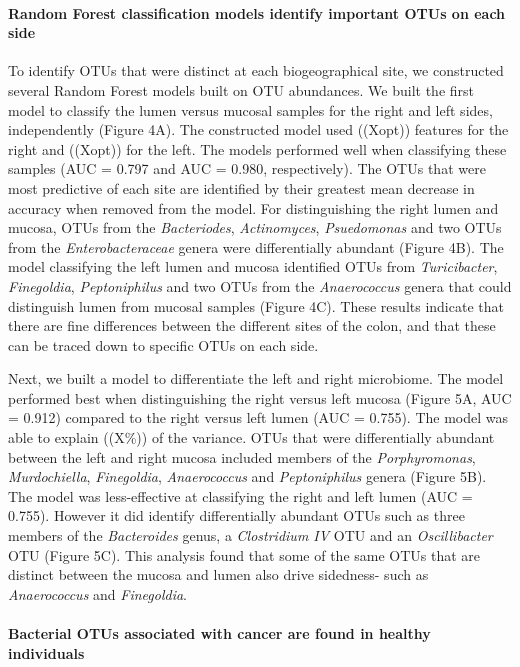 \documentclass[11pt,]{article}
\let\oldparagraph\paragraph
\renewcommand{\paragraph}[1]{\oldparagraph{#1}\mbox{}}
\begin{document}
\paragraph{Random Forest classification models identify important OTUs
on each
side}\label{random-forest-classification-models-identify-important-otus-on-each-side}

To identify OTUs that were distinct at each biogeographical site, we
constructed several Random Forest models built on OTU abundances. We
built the first model to classify the lumen versus mucosal samples for
the right and left sides, independently (Figure 4A). The constructed
model used ((Xopt)) features for the right and ((Xopt)) for the left.
The models performed well when classifying these samples (AUC = 0.797
and AUC = 0.980, respectively). The OTUs that were most predictive of
each site are identified by their greatest mean decrease in accuracy
when removed from the model. For distinguishing the right lumen and
mucosa, OTUs from the \emph{Bacteriodes}, \emph{Actinomyces},
\emph{Psuedomonas} and two OTUs from the \emph{Enterobacteraceae} genera
were differentially abundant (Figure 4B). The model classifying the left
lumen and mucosa identified OTUs from \emph{Turicibacter},
\emph{Finegoldia}, \emph{Peptoniphilus} and two OTUs from the
\emph{Anaerococcus} genera that could distinguish lumen from mucosal
samples (Figure 4C). These results indicate that there are fine
differences between the different sites of the colon, and that these can
be traced down to specific OTUs on each side.

Next, we built a model to differentiate the left and right microbiome.
The model performed best when distinguishing the right versus left
mucosa (Figure 5A, AUC = 0.912) compared to the right versus left lumen
(AUC = 0.755). The model was able to explain ((X\%)) of the variance.
OTUs that were differentially abundant between the left and right mucosa
included members of the \emph{Porphyromonas}, \emph{Murdochiella},
\emph{Finegoldia}, \emph{Anaerococcus} and \emph{Peptoniphilus} genera
(Figure 5B). The model was less-effective at classifying the right and
left lumen (AUC = 0.755). However it did identify differentially
abundant OTUs such as three members of the \emph{Bacteroides} genus, a
\emph{Clostridium IV} OTU and an \emph{Oscillibacter} OTU (Figure 5C).
This analysis found that some of the same OTUs that are distinct between
the mucosa and lumen also drive sidedness- such as \emph{Anaerococcus}
and \emph{Finegoldia}.

\paragraph{Bacterial OTUs associated with cancer are found in healthy
individuals}\label{bacterial-otus-associated-with-cancer-are-found-in-healthy-individuals}
\end{document}
